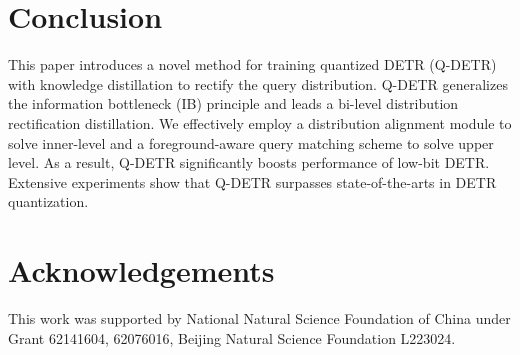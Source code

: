 \documentclass[10pt,twocolumn,letterpaper]{article}
\begin{document}
\section{Conclusion}
This paper introduces a novel method for training quantized DETR (Q-DETR) with knowledge distillation to rectify the query distribution. Q-DETR generalizes the information bottleneck (IB) principle and leads a bi-level distribution rectification distillation. We effectively employ a distribution alignment module to solve inner-level and a foreground-aware query matching scheme to solve upper level. As a result, Q-DETR significantly boosts performance of low-bit DETR. Extensive experiments show that Q-DETR surpasses state-of-the-arts in DETR quantization.

\section{Acknowledgements}
This work was supported by National Natural Science Foundation of China under Grant 62141604, 62076016, Beijing Natural Science Foundation L223024. 



\end{document}
